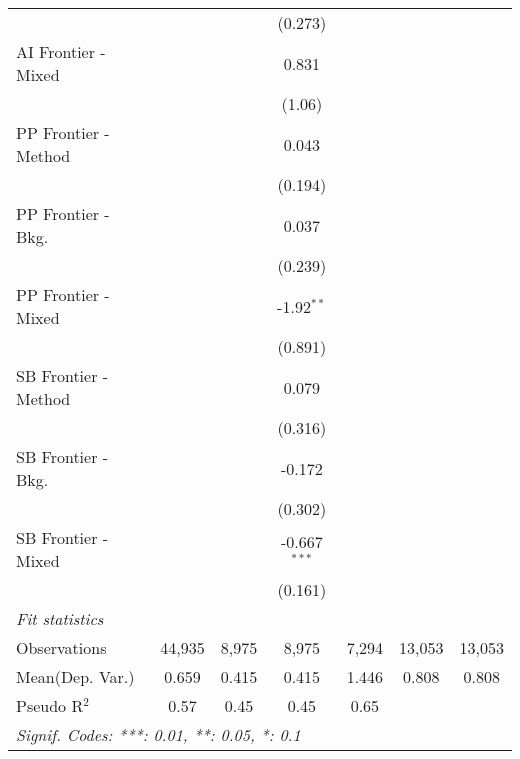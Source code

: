 \begin{tabular}{lcccccc}
                        &               &         & (0.273)        &               &        &   \\   
   AI Frontier - Mixed  &               &         & 0.831          &               &        &   \\   
                        &               &         & (1.06)         &               &        &   \\   
   PP Frontier - Method &               &         & 0.043          &               &        &   \\   
                        &               &         & (0.194)        &               &        &   \\   
   PP Frontier - Bkg.   &               &         & 0.037          &               &        &   \\   
                        &               &         & (0.239)        &               &        &   \\   
   PP Frontier - Mixed  &               &         & -1.92$^{**}$   &               &        &   \\   
                        &               &         & (0.891)        &               &        &   \\   
   SB Frontier - Method &               &         & 0.079          &               &        &   \\   
                        &               &         & (0.316)        &               &        &   \\   
   SB Frontier - Bkg.   &               &         & -0.172         &               &        &   \\   
                        &               &         & (0.302)        &               &        &   \\   
   SB Frontier - Mixed  &               &         & -0.667$^{***}$ &               &        &   \\   
                        &               &         & (0.161)        &               &        &   \\   
   \midrule
   \emph{Fit statistics}\\
   Observations         & 44,935        & 8,975   & 8,975          & 7,294         & 13,053 & 13,053\\  
Mean(Dep. Var.) & 0.659 & 0.415 & 0.415 & 1.446 & 0.808 & 0.808 \\
   Pseudo R$^2$         & 0.57          & 0.45    & 0.45           & 0.65          &        & \\  
   \midrule \midrule
   \multicolumn{7}{l}{\emph{Signif. Codes: ***: 0.01, **: 0.05, *: 0.1}}\\
\end{tabular}
\par\endgroup
